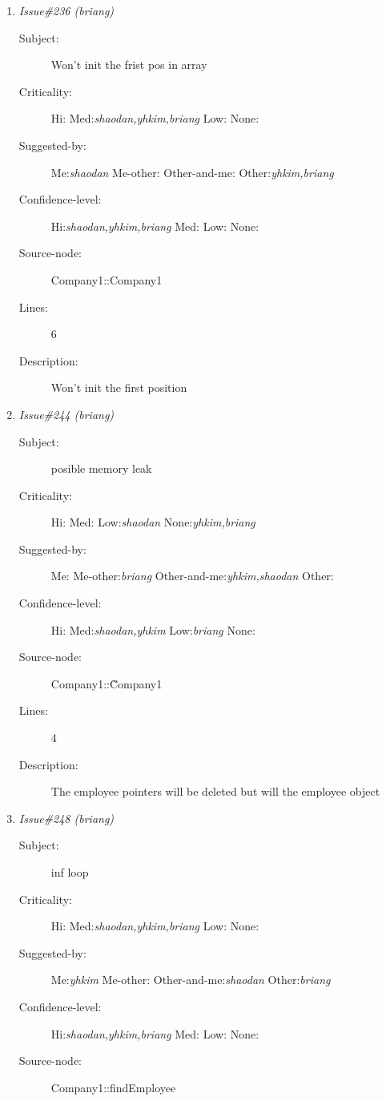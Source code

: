 \begin{enumerate}
\begin{description}
\item [Lines:] 4

\item [Description:] The value zero won't be accepted in this range check
\end{description}
\item {\it Issue\#236 (briang)}
\begin{description}
\item [Subject:] Won't init the frist pos in array
\item [Criticality:] Hi:{\it } Med:{\it shaodan,yhkim,briang} Low:{\it } None:{\it }
\item [Suggested-by:] Me:{\it shaodan} Me-other:{\it } Other-and-me:{\it } Other:{\it yhkim,briang}
\item [Confidence-level:] Hi:{\it shaodan,yhkim,briang} Med:{\it } Low:{\it } None:{\it }
\item [Source-node:] Company1::Company1

\item [Lines:] 6

\item [Description:] Won't init the first position
\end{description}
\item {\it Issue\#244 (briang)}
\begin{description}
\item [Subject:] posible memory leak
\item [Criticality:] Hi:{\it } Med:{\it } Low:{\it shaodan} None:{\it yhkim,briang}
\item [Suggested-by:] Me:{\it } Me-other:{\it briang} Other-and-me:{\it yhkim,shaodan} Other:{\it }
\item [Confidence-level:] Hi:{\it } Med:{\it shaodan,yhkim} Low:{\it briang} None:{\it }
\item [Source-node:] Company1::\~Company1

\item [Lines:] 4

\item [Description:] The employee pointers will be deleted but will
the employee object
\end{description}
\item {\it Issue\#248 (briang)}
\begin{description}
\item [Subject:] inf loop
\item [Criticality:] Hi:{\it } Med:{\it shaodan,yhkim,briang} Low:{\it } None:{\it }
\item [Suggested-by:] Me:{\it yhkim} Me-other:{\it } Other-and-me:{\it shaodan} Other:{\it briang}
\item [Confidence-level:] Hi:{\it shaodan,yhkim,briang} Med:{\it } Low:{\it } None:{\it }
\item [Source-node:] Company1::findEmployee


\end{description}
\end{enumerate}
